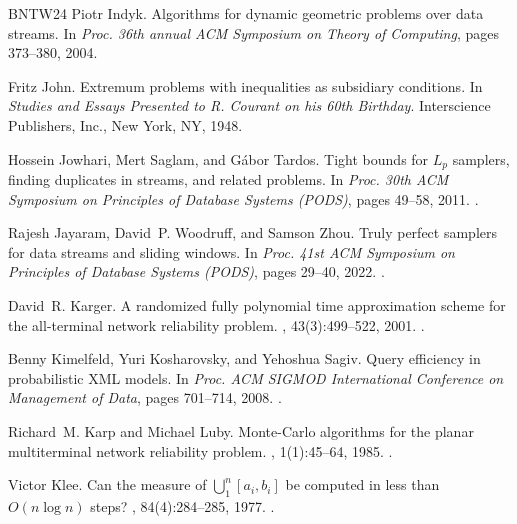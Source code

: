 \documentclass[11pt]{article}
\begin{document}
\begin{thebibliography}{BNTW24}
Piotr Indyk.
\newblock Algorithms for dynamic geometric problems over data streams.
\newblock In {\em Proc. 36th annual ACM Symposium on Theory of Computing},
  pages 373--380, 2004.

Fritz John.
\newblock Extremum problems with inequalities as subsidiary conditions.
\newblock In {\em Studies and Essays Presented to R. Courant on his 60th
  Birthday}. Interscience Publishers, Inc., New York, NY, 1948.

Hossein Jowhari, Mert Saglam, and G{\'{a}}bor Tardos.
\newblock Tight bounds for {$L_p$} samplers, finding duplicates in streams, and
  related problems.
\newblock In {\em Proc. 30th {ACM} Symposium on Principles of Database Systems
  (PODS)}, pages 49--58, 2011.
\newblock \href {https://doi.org/10.1145/1989284.1989289}
  {}.

Rajesh Jayaram, David~P. Woodruff, and Samson Zhou.
\newblock Truly perfect samplers for data streams and sliding windows.
\newblock In {\em Proc. 41st ACM Symposium on Principles of Database Systems
  (PODS)}, pages 29--40, 2022.
\newblock \href {https://doi.org/10.1145/3517804.3524139}
  {}.

David~R. Karger.
\newblock A randomized fully polynomial time approximation scheme for the
  all-terminal network reliability problem.
, 43(3):499--522, 2001.
\newblock \href {https://doi.org/10.1137/S0036144501387141}
  {}.

Benny Kimelfeld, Yuri Kosharovsky, and Yehoshua Sagiv.
\newblock Query efficiency in probabilistic {XML} models.
\newblock In {\em Proc. {ACM} {SIGMOD} International Conference on Management
  of Data}, pages 701--714, 2008.
\newblock \href {https://doi.org/10.1145/1376616.1376687}
  {}.

Richard~M. Karp and Michael Luby.
\newblock Monte-{C}arlo algorithms for the planar multiterminal network
  reliability problem.
, 1(1):45--64, 1985.
\newblock \href {https://doi.org/10.1016/0885-064X(85)90021-4}
  {}.

Victor Klee.
\newblock Can the measure of $\bigcup_1^n [a_i, b_i]$ be computed in less than
  {$O(n \log n)$} steps?
, 84(4):284--285, 1977.
\newblock \href {https://doi.org/10.1080/00029890.1977.11994336}
  {}.


\end{thebibliography}
\end{document}
